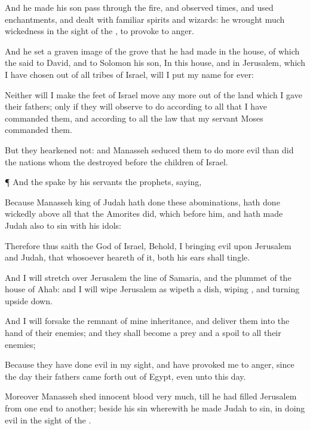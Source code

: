 {And he made his
son
pass through the
fire, and observed
times, and used
enchantments, and
dealt with familiar
spirits and
wizards: he
wrought
much
wickedness in the
sight of the
{}, to provoke
{} to
anger.

And he
set a graven
image of the
grove that he had
made in the
house, of which the
{}
said to
David, and to
Solomon his
son, In this
house, and in
Jerusalem, which I have
chosen out of all
tribes of
Israel, will I
put my
name for
ever:

Neither will I make the
feet of
Israel
move any
more out of the
land which I
gave their
fathers; only if they will
observe to
do according to all that I have
commanded them, and according to all the
law that my
servant
Moses
commanded them.

But they
hearkened not: and
Manasseh
seduced them to
do more
evil than did the
nations whom the
{}
destroyed
before the
children of
Israel.


\par }{\PP {}¶ And the
{}
spake
by his
servants the
prophets,
saying,

Because
Manasseh
king of
Judah hath
done these
abominations,
{} hath done
wickedly above all that the
Amorites
did, which
{}
before him, and hath made
Judah also to
sin with his
idols:

Therefore thus
saith the
{}
God of
Israel, Behold, I
{}
bringing
{}
evil upon
Jerusalem and
Judah, that whosoever
heareth of it,
both his
ears shall
tingle.

And I will
stretch over
Jerusalem the
line of
Samaria, and the
plummet of the
house of
Ahab: and I will
wipe
Jerusalem as
{}
wipeth a
dish,
wiping
{}, and
turning
{} upside
down.

And I will
forsake the
remnant of mine
inheritance, and
deliver them into the
hand of their
enemies; and they shall become a
prey and a
spoil to all their
enemies;

Because they have
done
{}
evil in my
sight, and have
provoked me to
anger, since the
day their
fathers came
forth out of
Egypt, even unto this
day.

Moreover
Manasseh
shed
innocent
blood
very
much, till he had
filled
Jerusalem from one
end to
another; beside his
sin wherewith he made
Judah to
sin, in
doing
{}
evil in the
sight of the
{}.


}
